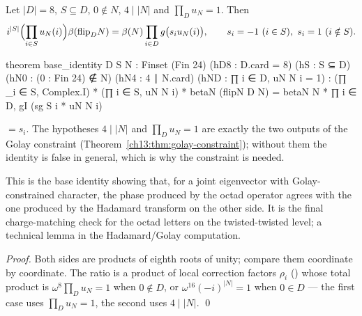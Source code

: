 \begin{lemma}\label{ch13:lem:base}
Let $|D|=8$, $S\subseteq D$, $0\notin N$, $4\mid|N|$ and $\prod_Du_N=1$. Then
\begin{equation*}
  i^{|S|}\Bigl(\prod_{i\in S}u_N(i)\Bigr)\beta(\mathrm{flip}_D N)=\beta(N)\prod_{i\in D}g\bigl(s_iu_N(i)\bigr),\qquad
  s_i=-1\ (i\in S),\ s_i=1\ (i\notin S).
\end{equation*}
\end{lemma}
\begin{leancode}
theorem base_identity {D S N : Finset (Fin 24)} (hD8 : D.card = 8) (hS : S ⊆ D)
    (hN0 : (0 : Fin 24) ∉ N) (hN4 : 4 ∣ N.card) (hND : ∏ i ∈ D, uN N i = 1) :
    (∏ _i ∈ S, Complex.I) * (∏ i ∈ S, uN N i) * betaN (flipN D N)
      = betaN N * ∏ i ∈ D, gI (sg S i * uN N i)
\end{leancode}
\begin{dictionary}
 $=s_i$. The hypotheses $4\mid|N|$ and $\prod_Du_N=1$ are exactly the two outputs of the Golay
constraint (Theorem~\ref{ch13:thm:golay-constraint}); without them the identity is false in general, which
is why the constraint is needed.
\end{dictionary}
\begin{physics}
This is the base identity showing that, for a joint eigenvector with Golay-constrained character, the phase produced by the octad operator agrees with the one produced by the Hadamard transform on the other side. It is the final charge-matching check for the octad letters on the twisted-twisted level; a technical lemma in the Hadamard/Golay computation.
\end{physics}
\noindent\emph{Proof.} Both sides are products of eighth roots of unity; compare them coordinate by
coordinate. The ratio is a product of local correction factors $\rho_i$ () whose total product is
$\omega^8\prod_Du_N=1$ when $0\notin D$, or $\omega^{16}(-i)^{|N|}=1$ when $0\in D$ --- the first case uses $\prod_Du_N=1$,
the second uses $4\mid|N|$. \qed

